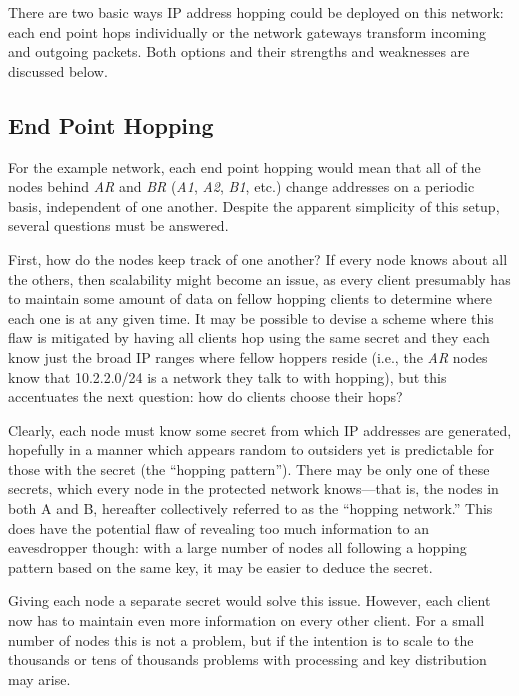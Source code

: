 \par There are two basic ways IP address hopping could be deployed on this network: each end point hops individually or the network gateways transform incoming and outgoing packets. Both options and their strengths and weaknesses are discussed below.

\subsection{End Point Hopping}
\par For the example network, each end point hopping would mean that all of the nodes behind \textit{AR} and \textit{BR} (\textit{A1}, \textit{A2}, \textit{B1}, etc.) change addresses on a periodic basis, independent of one another. Despite the apparent simplicity of this setup, several questions must be answered.

\par First, how do the nodes keep track of one another? If every node knows about all the others, then scalability might become an issue, as every client presumably has to maintain some amount of data on fellow hopping clients to determine where each one is at any given time. It may be possible to devise a scheme where this flaw is mitigated by having all clients hop using the same secret and they each know just the broad IP ranges where fellow hoppers reside (i.e., the \textit{AR} nodes know that 10.2.2.0/24 is a network they talk to with hopping), but this accentuates the next question: how do clients choose their hops?

\par Clearly, each node must know some secret from which IP addresses are generated, hopefully in a manner which appears random to outsiders yet is predictable for those with the secret (the ``hopping pattern''). There may be only one of these secrets, which every node in the protected network knows---that is, the nodes in both A and B, hereafter collectively referred to as the ``hopping network.'' This does have the potential flaw of revealing too much information to an eavesdropper though: with a large number of nodes all following a hopping pattern based on the same key, it may be easier to deduce the secret.

\par Giving each node a separate secret would solve this issue. However, each client now has to maintain even more information on every other client. For a small number of nodes this is not a problem, but if the intention is to scale to the thousands or tens of thousands problems with processing and key distribution may arise.  

